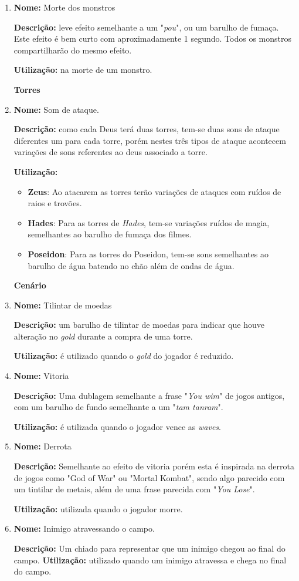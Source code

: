 \documentclass[11pt]{article} %
\begin{document}
\begin{enumerate}
\item
\textbf{Nome:} Morte dos monstros

\textbf{Descrição:} leve efeito semelhante a um "\textit{pou}", ou um barulho de fumaça. Este efeito é bem curto com aproximadamente 1 segundo. Todos os monstros compartilharão do mesmo efeito.

\textbf{Utilização:} na morte de um monstro.


{\LARGE \textbf{Torres}}

\item
\textbf{Nome:} Som de ataque.

\textbf{Descrição:} como cada Deus terá duas torres, tem-se duas sons de ataque diferentes um para cada torre, porém nestes três tipos de ataque acontecem variações de sons referentes ao deus associado a torre.

\textbf{Utilização:} 
\begin{itemize}
\item \textbf{Zeus}: Ao atacarem as torres terão variações de ataques com ruídos de raios e trovões.
\item \textbf{Hades}: Para as torres de \textit{Hades}, tem-se variações ruídos de magia, semelhantes ao barulho de fumaça dos filmes.
\item \textbf{Poseidon}: Para as torres do Poseidon, tem-se sons semelhantes ao barulho de água batendo no chão além de ondas de água.
\end{itemize}

{\LARGE \textbf{Cenário}}

\item
\textbf{Nome:} Tilintar de moedas

\textbf{Descrição:} um barulho de tilintar de moedas para indicar que houve alteração no \textit{gold} durante a compra de uma torre. 

\textbf{Utilização:} é utilizado quando o \textit{gold} do jogador é reduzido.

\item
\textbf{Nome:} Vitoria

\textbf{Descrição:} Uma dublagem semelhante a frase "\textit{You wim}" de jogos antigos, com um barulho de fundo semelhante a um "\textit{tam tanram}".

\textbf{Utilização:} é utilizada quando o jogador vence as \textit{waves}.

\item
\textbf{Nome:} Derrota

\textbf{Descrição:} Semelhante ao efeito de vitoria porém esta é inspirada na derrota de jogos como "God of War" ou "Mortal Kombat", sendo algo parecido com um tintilar de metais, além de uma frase parecida com "\textit{You Lose}".

\textbf{Utilização:} utilizada quando o jogador morre.

\item
\textbf{Nome:} Inimigo atravessando o campo.

\textbf{Descrição:} Um chiado para representar que um inimigo chegou ao final do campo.
\textbf{Utilização:} utilizado quando um inimigo atravessa e chega no final do campo.

\end{enumerate}
\end{document}
